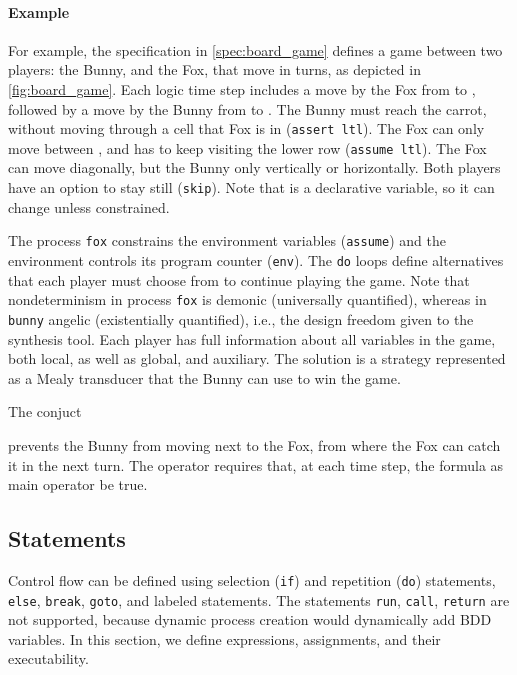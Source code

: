 \documentclass[copyright]{eptcs}
\begin{document}
\paragraph{Example}

For example, the specification in \cref{spec:board_game} defines a game between two players: the Bunny, and the Fox, that move in turns, as depicted in \cref{fig:board_game}.
Each logic time step includes a move by the Fox from  to , followed by a move by the Bunny from  to .
The Bunny must reach the carrot, without moving through a cell that Fox is in (\texttt{assert ltl}).
The Fox can only move between , and has to keep visiting the lower row (\texttt{assume ltl}).
The Fox can move diagonally, but the Bunny only vertically or horizontally.
Both players have an option to stay still (\texttt{skip}).
Note that  is a declarative variable, so it can change unless constrained.



The process \texttt{fox} constrains the environment variables  (\texttt{assume}) and the environment controls its program counter (\texttt{env}).
The \texttt{do} loops define alternatives that each player must choose from to continue playing the game.
Note that nondeterminism in process \texttt{fox} is demonic (universally quantified), whereas in \texttt{bunny} angelic (existentially quantified), i.e., the design freedom given to the synthesis tool.
Each player has full information about all variables in the game, both local, as well as global, and auxiliary.
The solution is a strategy represented as a Mealy transducer \cite{Mealy55} that the Bunny can use to win the game.

The conjuct

prevents the Bunny from moving next to the Fox, from where the Fox can catch it in the next turn.
The  operator requires that, at each time step, the formula  as main operator be true.


\subsection{Statements}
\label{sec:guarded-statements}

Control flow can be defined using selection (\texttt{if}) and repetition (\texttt{do}) statements, \texttt{else}, \texttt{break}, \texttt{goto}, and labeled statements.
The statements \texttt{run}, \texttt{call}, \texttt{return} are not supported, because dynamic process creation would dynamically add BDD variables.
In this section, we define expressions, assignments, and their executability.
\end{document}
